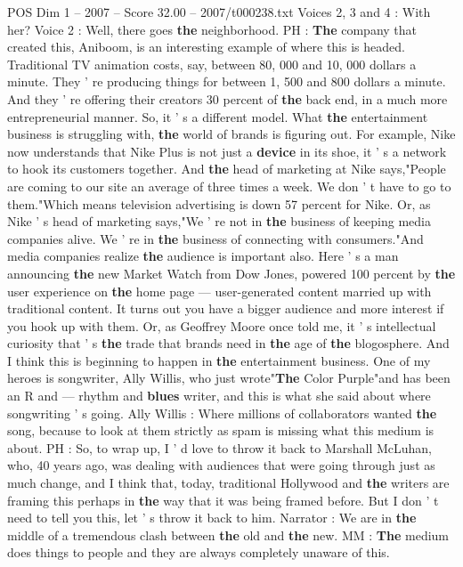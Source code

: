 \begin{textsample}{POS Dim 1 – 2007 – Score 32.00 – 2007/t000238.txt}
Voices 2, 3 and 4 : With her?
Voice 2 : Well, there goes \textbf{the} neighborhood.
PH : \textbf{The} company that created this, Aniboom, is an interesting example of where this is headed.
Traditional TV animation costs, say, between 80, 000 and 10, 000 dollars a minute.
They ' re producing things for between 1, 500 and 800 dollars a minute.
And they ' re offering their creators 30 percent of \textbf{the} back end, in a much more entrepreneurial manner.
So, it ' s a different model.
What \textbf{the} entertainment business is struggling with, \textbf{the} world of brands is figuring out.
For example, Nike now understands that Nike Plus is not just a \textbf{device} in its shoe, it ' s a network to hook its customers together.
And \textbf{the} head of marketing at Nike says,"People are coming to our site an average of three times a week.
We don ' t have to go to them."Which means television advertising is down 57 percent for Nike.
Or, as Nike ' s head of marketing says,"We ' re not in \textbf{the} business of keeping media companies alive.
We ' re in \textbf{the} business of connecting with consumers."And media companies realize \textbf{the} audience is important also.
Here ' s a man announcing \textbf{the} new Market Watch from Dow Jones, powered 100 percent by \textbf{the} user experience on \textbf{the} home page — user-generated content married up with traditional content.
It turns out you have a bigger audience and more interest if you hook up with them.
Or, as Geoffrey Moore once told me, it ' s intellectual curiosity that ' s \textbf{the} trade that brands need in \textbf{the} age of \textbf{the} blogosphere.
And I think this is beginning to happen in \textbf{the} entertainment business.
One of my heroes is songwriter, Ally Willis, who just wrote"\textbf{The} Color Purple"and has been an R and — rhythm and \textbf{blues} writer, and this is what she said about where songwriting ' s going.
Ally Willis : Where millions of collaborators wanted \textbf{the} song, because to look at them strictly as spam is missing what this medium is about.
PH : So, to wrap up, I ' d love to throw it back to Marshall McLuhan, who, 40 years ago, was dealing with audiences that were going through just as much change, and I think that, today, traditional Hollywood and \textbf{the} writers are framing this perhaps in \textbf{the} way that it was being framed before.
But I don ' t need to tell you this, let ' s throw it back to him.
Narrator : We are in \textbf{the} middle of a tremendous clash between \textbf{the} old and \textbf{the} new.
MM : \textbf{The} medium does things to people and they are always completely unaware of this.

\end{textsample}

